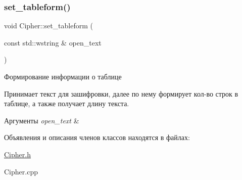 \subsubsection{\texorpdfstring{set\+\_\+tableform()}{set\_tableform()}}
{\footnotesize\ttfamily void Cipher\+::set\+\_\+tableform (\begin{DoxyParamCaption}\item[{const std\+::wstring \&}]{open\+\_\+text }\end{DoxyParamCaption})}



Формирование информации о таблице 

Принимает текст для зашифровки, далее по нему формирует кол-\/во строк в таблице, а также получает длину текста.


\begin{DoxyParams}{Аргументы}
{\em open\+\_\+text} & \\
\hline
\end{DoxyParams}


Объявления и описания членов классов находятся в файлах\+:\begin{DoxyCompactItemize}
\item 
\hyperlink{Cipher_8h}{Cipher.\+h}\item 
Cipher.\+cpp\end{DoxyCompactItemize}
